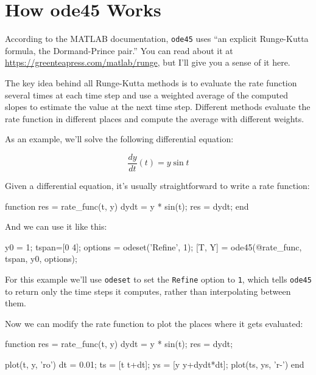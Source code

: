 

\section{How ode45 Works}
\label{s:howode45}

According to the MATLAB documentation, \lstinline{ode45} uses ``an explicit Runge-Kutta formula, the Dormand-Prince pair.''  You can read about it at  \url{https://greenteapress.com/matlab/runge}, but I'll give you a sense of it here.


The key idea behind all Runge-Kutta methods is to evaluate the rate function several times at each time step and use a weighted average of the computed slopes to estimate the value at the next time step.
Different methods evaluate the rate function in different places and compute the average with different weights.


As an example, we'll solve the following differential equation:

\[ \frac{dy}{dt}(t) = y \sin t \]

Given a differential equation, it's usually straightforward to write a rate function:

\begin{code}
function res = rate_func(t, y)
    dydt = y * sin(t);
    res = dydt;
end
\end{code}

And we can use it like this:

\begin{code}
    y0 = 1;
    tspan=[0 4];
    options = odeset('Refine', 1);
    [T, Y] = ode45(@rate_func, tspan, y0, options);
\end{code}

For this example we'll use \lstinline{odeset} to set the \lstinline{Refine} option to \lstinline{1}, which tells \lstinline{ode45} to return only the time steps it computes, rather than interpolating between them.


Now we can modify the rate function to plot the places where it gets evaluated:

\begin{code}
function res = rate_func(t, y)
    dydt = y * sin(t);
    res = dydt;

    plot(t, y, 'ro')
    dt = 0.01;
    ts = [t t+dt];
    ys = [y y+dydt*dt];
    plot(ts, ys, 'r-')
end
\end{code}


